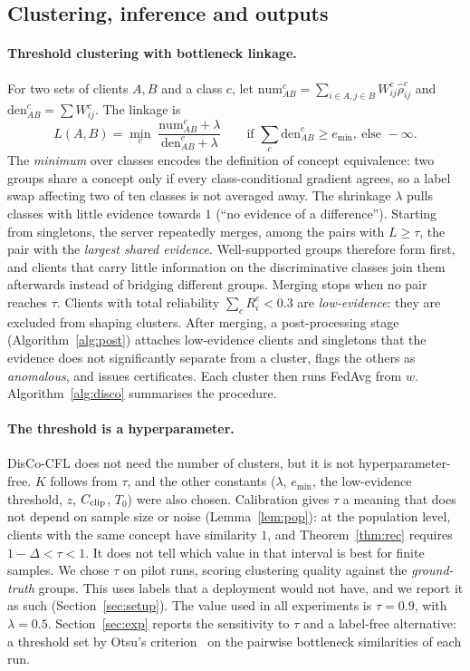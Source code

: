 \documentclass[pdflatex,sn-apa]{sn-jnl}
\theoremstyle{thmstyleone}
\theoremstyle{thmstylethree}
\newcommand{\rhohat}{\hat\rho}
\begin{document}
\subsection{Clustering, inference and outputs}
\paragraph{Threshold clustering with bottleneck linkage.}
For two sets of clients $A,B$ and a class $c$, let $\mathrm{num}^c_{AB}=\sum_{i\in A,j\in B}W_{ij}^c\rhohat_{ij}^c$ and $\mathrm{den}^c_{AB}=\sum W_{ij}^c$. The linkage is
\begin{equation}\label{eq:link}
L(A,B)=\min_{c}\;\frac{\mathrm{num}^c_{AB}+\lambda}{\mathrm{den}^c_{AB}+\lambda}\qquad\text{if }\textstyle\sum_c\mathrm{den}^c_{AB}\ge e_{\min},\ \text{else }-\infty.
\end{equation}
The \emph{minimum} over classes encodes the definition of concept equivalence: two groups share a concept only if every class-conditional gradient agrees, so a label swap affecting two of ten classes is not averaged away. The shrinkage $\lambda$ pulls classes with little evidence towards $1$ (``no evidence of a difference''). Starting from singletons, the server repeatedly merges, among the pairs with $L\ge\tau$, the pair with the \emph{largest shared evidence}. Well-supported groups therefore form first, and clients that carry little information on the discriminative classes join them afterwards instead of bridging different groups. Merging stops when no pair reaches $\tau$. Clients with total reliability $\sum_c R_i^c<0.3$ are \emph{low-evidence}: they are excluded from shaping clusters. After merging, a post-processing stage (Algorithm~\ref{alg:post}) attaches low-evidence clients and singletons that the evidence does not significantly separate from a cluster, flags the others as \emph{anomalous}, and issues certificates. Each cluster then runs FedAvg from $w$. Algorithm~\ref{alg:disco} summarises the procedure.

\paragraph{The threshold is a hyperparameter.} DisCo-CFL does not need the number of clusters, but it is not hyperparameter-free. $K$ follows from $\tau$, and the other constants ($\lambda$, $e_{\min}$, the low-evidence threshold, $z$, $C_{\rm clip}$, $T_0$) were also chosen. Calibration gives $\tau$ a meaning that does not depend on sample size or noise (Lemma~\ref{lem:pop}): at the population level, clients with the same concept have similarity $1$, and Theorem~\ref{thm:rec} requires $1-\Delta<\tau<1$. It does not tell which value in that interval is best for finite samples. We chose $\tau$ on pilot runs, scoring clustering quality against the \emph{ground-truth} groups. This uses labels that a deployment would not have, and we report it as such (Section~\ref{sec:setup}). The value used in all experiments is $\tau=0.9$, with $\lambda=0.5$. Section~\ref{sec:exp} reports the sensitivity to $\tau$ and a label-free alternative: a threshold set by Otsu's criterion~\citep{otsu1979threshold} on the pairwise bottleneck similarities of each run.
\end{document}

